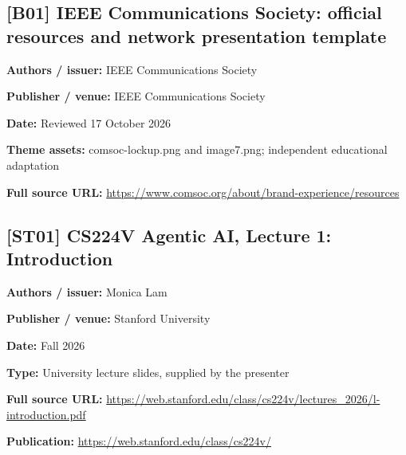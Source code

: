 \documentclass[10pt,letterpaper]{article}
\begin{document}
\subsection*{[B01] IEEE Communications Society: official resources and network presentation template}
\textbf{Authors / issuer:} IEEE Communications Society\par
\textbf{Publisher / venue:} IEEE Communications Society\par
\textbf{Date:} Reviewed 17 October 2026\par
\textbf{Theme assets:} comsoc-lockup.png and image7.png; independent educational adaptation\par
\textbf{Full source URL:} \href{https://www.comsoc.org/about/brand-experience/resources}{\small\ttfamily https:/\allowbreak{}/\allowbreak{}www.\allowbreak{}comsoc.\allowbreak{}org/\allowbreak{}about/\allowbreak{}brand-\allowbreak{}experience/\allowbreak{}resources}\par
\par\medskip
\subsection*{[ST01] CS224V Agentic AI, Lecture 1: Introduction}
\textbf{Authors / issuer:} Monica Lam\par
\textbf{Publisher / venue:} Stanford University\par
\textbf{Date:} Fall 2026\par
\textbf{Type:} University lecture slides, supplied by the presenter\par
\textbf{Full source URL:} \href{https://web.stanford.edu/class/cs224v/lectures_2026/l-introduction.pdf}{\small\ttfamily https:/\allowbreak{}/\allowbreak{}web.\allowbreak{}stanford.\allowbreak{}edu/\allowbreak{}class/\allowbreak{}cs224v/\allowbreak{}lectures\_\allowbreak{}2026/\allowbreak{}l-\allowbreak{}introduction.\allowbreak{}pdf}\par
\textbf{Publication:} \href{https://web.stanford.edu/class/cs224v/}{\small\ttfamily https:/\allowbreak{}/\allowbreak{}web.\allowbreak{}stanford.\allowbreak{}edu/\allowbreak{}class/\allowbreak{}cs224v/\allowbreak{}}\par
\par\medskip
\end{document}
